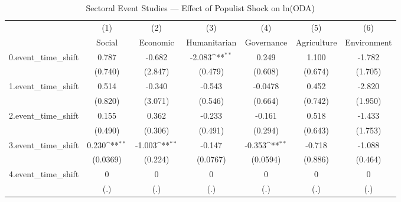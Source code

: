 \begin{table}[htbp]\centering
\def\sym#1{\ifmmode^{#1}\else\(^{#1}\)\fi}
\caption{Sectoral Event Studies — Effect of Populist Shock on ln(ODA)}
\begin{tabular}{l*{6}{c}}
\toprule
            &\multicolumn{1}{c}{(1)}&\multicolumn{1}{c}{(2)}&\multicolumn{1}{c}{(3)}&\multicolumn{1}{c}{(4)}&\multicolumn{1}{c}{(5)}&\multicolumn{1}{c}{(6)}\\
            &\multicolumn{1}{c}{Social}&\multicolumn{1}{c}{Economic}&\multicolumn{1}{c}{Humanitarian}&\multicolumn{1}{c}{Governance}&\multicolumn{1}{c}{Agriculture}&\multicolumn{1}{c}{Environment}\\
\midrule
0.event\_time\_shift&       0.787         &      -0.682         &      -2.083\sym{**} &       0.249         &       1.100         &      -1.782         \\
            &     (0.740)         &     (2.847)         &     (0.479)         &     (0.608)         &     (0.674)         &     (1.705)         \\
\addlinespace
1.event\_time\_shift&       0.514         &      -0.340         &      -0.543         &     -0.0478         &       0.452         &      -2.820         \\
            &     (0.820)         &     (3.071)         &     (0.546)         &     (0.664)         &     (0.742)         &     (1.950)         \\
\addlinespace
2.event\_time\_shift&       0.155         &       0.362         &      -0.233         &      -0.161         &       0.518         &      -1.433         \\
            &     (0.490)         &     (0.306)         &     (0.491)         &     (0.294)         &     (0.643)         &     (1.753)         \\
\addlinespace
3.event\_time\_shift&       0.230\sym{**} &      -1.003\sym{**} &      -0.147         &      -0.353\sym{**} &      -0.718         &      -1.088         \\
            &    (0.0369)         &     (0.224)         &    (0.0767)         &    (0.0594)         &     (0.886)         &     (0.464)         \\
\addlinespace
4.event\_time\_shift&           0         &           0         &           0         &           0         &           0         &           0         \\
            &         (.)         &         (.)         &         (.)         &         (.)         &         (.)         &         (.)         \\

\end{tabular}
\end{table}
